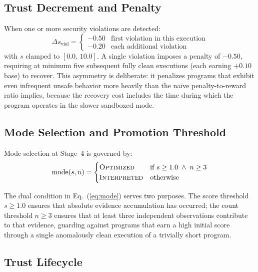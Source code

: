 \documentclass[conference]{IEEEtran}
\begin{document}
\subsection{Trust Decrement and Penalty}

When one or more security violations are detected:
\begin{equation}
  \Delta s_{\text{viol}} =
  \begin{cases}
    -0.50 & \text{first violation in this execution} \\
    -0.20 & \text{each additional violation}
  \end{cases}
  \label{eq:penalty}
\end{equation}
with $s$ clamped to $[0.0,\,10.0]$. A single violation imposes a
penalty of $-0.50$, requiring at minimum five subsequent fully clean
executions (each earning $+0.10$ base) to recover. This asymmetry
is deliberate: it penalizes programs that exhibit even infrequent
unsafe behavior more heavily than the na\"ive penalty-to-reward ratio
implies, because the recovery cost includes the time during which
the program operates in the slower sandboxed mode.

\subsection{Mode Selection and Promotion Threshold}

Mode selection at Stage~4 is governed by:
\begin{equation}
  \text{mode}(s, n) =
  \begin{cases}
    \textsc{Optimized}   & \text{if } s \geq 1.0 \;\wedge\; n \geq 3 \\
    \textsc{Interpreted} & \text{otherwise}
  \end{cases}
  \label{eq:mode}
\end{equation}

The dual condition in Eq.~(\ref{eq:mode}) serves two purposes. The
score threshold $s \geq 1.0$ ensures that absolute evidence
accumulation has occurred; the count threshold $n \geq 3$ ensures
that at least three independent observations contribute to that
evidence, guarding against programs that earn a high initial score
through a single anomalously clean execution of a trivially short
program.

\subsection{Trust Lifecycle}
\end{document}
